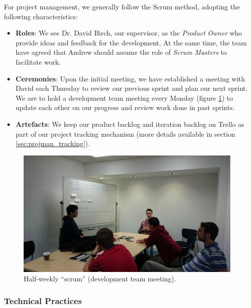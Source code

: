 \documentclass[a4paper, titlepage]{article}
\begin{document}
For project management, we generally follow the Scrum method, adopting the
following characteristics:
\begin{itemize}
  \item \textbf{Roles}: We see Dr. David Birch, our supervisor, as the \textit{Product Owner}
        who provide ideas and feedback for the development. At the same time,
        the team have agreed that Andrew should assume the role of
        \textit{Scrum Masters} to facilitate work.
  \item \textbf{Ceremonies}: Upon the initial meeting, we have established a
        meeting with David each Thursday to review our previous sprint 
        and plan our next sprint. We are to hold a development team
        meeting every Monday (figure \ref{fig:projman_scrum}) to update each other 
        on our progress and review work done in past sprints.
  \item \textbf{Artefacts}: We keep our product backlog and iteration backlog on
        Trello as part of our project tracking mechanism (more details
        available in section \ref{sec:projman_tracking}).
\end{itemize}


\begin{figure}[ht]
  \centering
    \includegraphics[width = 0.99\textwidth, trim= 0 0 0 3cm, clip]{./projman/scrum.jpg}
  \caption{Half-weekly ``scrum'' (development team meeting).}
  \label{fig:projman_scrum}
\end{figure}

\subsubsection{Technical Practices}
\end{document}
